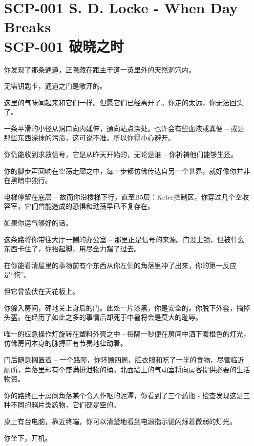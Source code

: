\chapter[SCP-001 破晓之时]{
	SCP-001 S. D. Locke - When Day Breaks \\
	SCP-001 破晓之时
}

\label{chap:SCP-001.when.day.breaks}

\begin{scpbox}

你发现了那条通道，正隐藏在距主干道一英里外的天然洞穴内。

无需钥匙卡，通道之门是敞开的。

这里的气味闻起来和它们一样。但愿它们已经离开了。你走的太远，你无法回头了。

一条平滑的小径从洞口向内延伸，通向站点深处。也许会有些血液或粪便 – 或是那些东西涂抹的污渍，这可说不准。所以你得小心避开。

你仍能收到求救信号，它是从昨天开始的，无论是谁 – 你祈祷他们能够生还。

你的脚步声回响在空荡走廊之中，每一步都仿佛传达自另一个世界，就好像你并非在黑暗中独行。

电梯停留在底层 – 故而你沿楼梯下行，直至B5层：Keter控制区，你穿过几个空收容室，它们曾能造成的恐惧和动荡早已不复存在。

如果你运气够好的话。

这条路将你带往大厅一侧的办公室 – 那里正是信号的来源。门没上锁，但被什么东西卡住了，你抬起脚，用尽全力踹了过去。

在你能看清屋里的事物前有个东西从你左侧的角落里冲了出来，你的第一反应是“狗”。

但它曾蛰伏在天花板上。

你躲入房间，砰地关上身后的门。此处一片漆黑，你是安全的。你脱下外套，摘掉头盔。在经历了如此之多的事情后却死于中暑将会是莫大的耻辱。

唯一的应急操作灯旋转在塑料外壳之中 - 每隔一秒便在房间中洒下暖橙色的灯光，仿佛房间本身的脉搏正有节奏地律动着。

门后随意搁置着 – 一个路障，你环顾四周，脏衣服和吃了一半的食物，尽管临近厕所，角落里却有个盛满排泄物的桶。北面墙上的气动室将向房客提供必要的生活物资。

你的路终止于房间角落某个令人作呕的泥潭，你看到了三个药瓶 - 检查发现这是三种不同的鸦片类药物，它们都是空的。

桌上有台电脑，靠近终端，你可以清楚地看到电源指示键闪烁着微弱的灯光。

你坐下，开机。

\end{scpbox}


